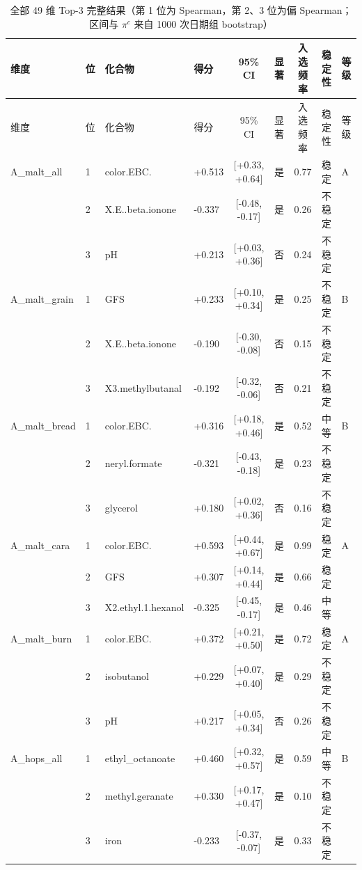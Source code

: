 {\scriptsize
\setlength{\tabcolsep}{4pt}
\begin{longtable}{llllcccll}
\caption{全部 49 维 Top-3 完整结果（第 1 位为 Spearman，第 2、3 位为偏 Spearman；区间与 $\pi^c$ 来自 1000 次日期组 bootstrap）}\label{tab:q2_top3}\\
\toprule
维度 & 位 & 化合物 & 得分 & 95\% CI & 显著 & 入选频率 & 稳定性 & 等级 \\
\midrule
\endfirsthead
\toprule
维度 & 位 & 化合物 & 得分 & 95\% CI & 显著 & 入选频率 & 稳定性 & 等级 \\
\midrule
\endhead
\bottomrule
\endfoot
A\_malt\_all & 1 & color.EBC. & +0.513 & [+0.33, +0.64] & 是 & 0.77 & 稳定 & A \\
 & 2 & X.E..beta.ionone & -0.337 & [-0.48, -0.17] & 是 & 0.26 & 不稳定 &  \\
 & 3 & pH & +0.213 & [+0.03, +0.36] & 否 & 0.24 & 不稳定 &  \\
A\_malt\_grain & 1 & GFS & +0.233 & [+0.10, +0.34] & 是 & 0.25 & 不稳定 & B \\
 & 2 & X.E..beta.ionone & -0.190 & [-0.30, -0.08] & 否 & 0.15 & 不稳定 &  \\
 & 3 & X3.methylbutanal & -0.192 & [-0.32, -0.06] & 否 & 0.21 & 不稳定 &  \\
A\_malt\_bread & 1 & color.EBC. & +0.316 & [+0.18, +0.46] & 是 & 0.52 & 中等 & B \\
 & 2 & neryl.formate & -0.321 & [-0.43, -0.18] & 是 & 0.23 & 不稳定 &  \\
 & 3 & glycerol & +0.180 & [+0.02, +0.36] & 否 & 0.16 & 不稳定 &  \\
A\_malt\_cara & 1 & color.EBC. & +0.593 & [+0.44, +0.67] & 是 & 0.99 & 稳定 & A \\
 & 2 & GFS & +0.307 & [+0.14, +0.44] & 是 & 0.66 & 稳定 &  \\
 & 3 & X2.ethyl.1.hexanol & -0.325 & [-0.45, -0.17] & 是 & 0.46 & 中等 &  \\
A\_malt\_burn & 1 & color.EBC. & +0.372 & [+0.21, +0.50] & 是 & 0.72 & 稳定 & A \\
 & 2 & isobutanol & +0.229 & [+0.07, +0.40] & 是 & 0.29 & 不稳定 &  \\
 & 3 & pH & +0.217 & [+0.05, +0.34] & 否 & 0.26 & 不稳定 &  \\
A\_hops\_all & 1 & ethyl\_octanoate & +0.460 & [+0.32, +0.57] & 是 & 0.59 & 中等 & B \\
 & 2 & methyl.geranate & +0.330 & [+0.17, +0.47] & 是 & 0.10 & 不稳定 &  \\
 & 3 & iron & -0.233 & [-0.37, -0.07] & 是 & 0.33 & 不稳定 &  \\

\end{longtable}}
